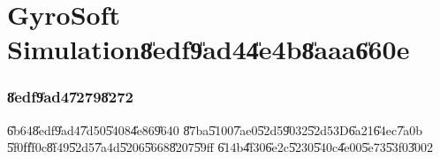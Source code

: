                       

\part{GyroSoft Simulation\U{8edf}\U{9ad4}\U{4e4b}\U{8aaa}\U{660e}}

\section{\U{8edf}\U{9ad4}\U{7279}\U{8272}}

\setcounter{xpage}{1}\U{6b64}\U{8edf}\U{9ad4}\U{7d50}\U{5408}\U{4e86}\U{9640}%
\U{87ba}\U{5100}\U{7ae0}\U{52d5}\U{9032}\U{52d5}3D\U{6a21}\U{64ec}\U{7a0b}%
\U{5f0f}\U{ff0c}\U{8f49}\U{52d5}\U{7a4d}\U{5206}\U{5668}\U{8207}\U{59ff}%
\U{614b}\U{4f30}\U{6e2c}\U{5230}\U{540c}\U{4e00}\U{5e73}\U{53f0}\U{3002}


